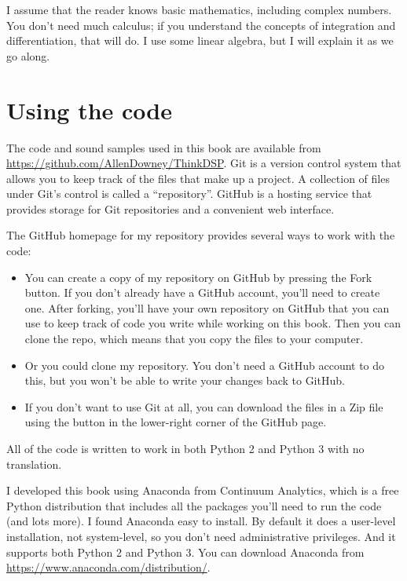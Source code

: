 \documentclass[12pt]{book}
\begin{document}
I assume that the reader knows basic mathematics, including complex
numbers.  You don't need much calculus; if you understand the concepts
of integration and differentiation, that will do.
I use some linear algebra, but I will explain it as we
go along.


\section{Using the code}
\label{code}

The code and sound samples used in this book are available from
\url{https://github.com/AllenDowney/ThinkDSP}.  Git is a version
control system that allows you to keep track of the files that
make up a project.  A collection of files under Git's control is
called a ``repository''.  GitHub is a hosting service that provides
storage for Git repositories and a convenient web interface.

The GitHub homepage for my repository provides several ways to
work with the code:

\begin{itemize}

\item You can create a copy of my repository
on GitHub by pressing the {\sf Fork} button.  If you don't already
have a GitHub account, you'll need to create one.  After forking, you'll
have your own repository on GitHub that you can use to keep track
of code you write while working on this book.  Then you can
clone the repo, which means that you copy the files
to your computer.

\item Or you could clone
my repository.  You don't need a GitHub account to do this, but you
won't be able to write your changes back to GitHub.

\item If you don't want to use Git at all, you can download the files
in a Zip file using the button in the lower-right corner of the
GitHub page.

\end{itemize}

All of the code is written to work in both Python 2 and Python 3
with no translation.

I developed this book using Anaconda from
Continuum Analytics, which is a free Python distribution that includes
all the packages you'll need to run the code (and lots more).
I found Anaconda easy to install.  By default it does a user-level
installation, not system-level, so you don't need administrative
privileges.  And it supports both Python 2 and Python 3.  You can
download Anaconda from \url{https://www.anaconda.com/distribution/}.
\end{document}
